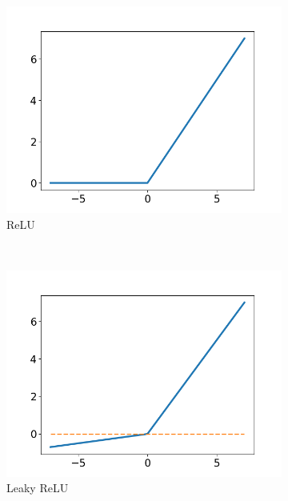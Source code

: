 \begin{figure}
  \centering
  \begin{subfigure}[t]{0.3\textwidth}
    \includegraphics[width=\textwidth]{files/figs/backg/relu.png}
    \caption{ReLU}
    \label{fig:relu}
  \end{subfigure}
  ~
  \begin{subfigure}[t]{0.3\textwidth}
    \includegraphics[width=\textwidth]{files/figs/backg/leaky_relu.png}
    \caption{Leaky ReLU}
    \label{fig:leaky-relu}
  \end{subfigure}
  ~
  \begin{subfigure}[t]{0.3\textwidth}

\end{subfigure}
\end{figure}
